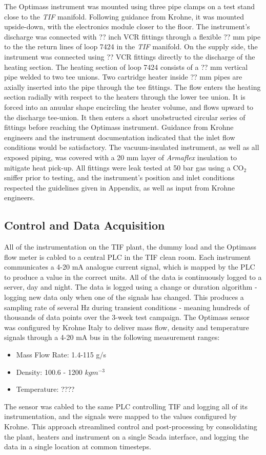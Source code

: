 \documentclass{report}
\begin{document}
The Optimass instrument was mounted using three pipe clamps on a test stand close to the \textit{TIF} manifold. Following guidance from Krohne, it was mounted upside-down, with the electronics module closer to the floor. The instrument's discharge was connected with ?? inch VCR fittings through a flexible ?? mm pipe to the the return lines of loop 7424 in the \textit{TIF} manifold. On the supply side, the instrument was connected using ?? VCR fittings directly to the discharge of the heating section. 
The heating section of loop 7424 consists of a ?? mm vertical pipe welded to two tee unions. Two cartridge heater inside ?? mm pipes are axially inserted into the pipe through the tee fittings. The flow enters the heating section radially with respect to the heaters through the lower tee union. It is forced into an anuular shape encircling the heater volume, and flows upward to the discharge tee-union. It then enters a short unobstructed circular series of fittings before reaching the Optimass instrument. Guidance from Krohne engineers and the instrument documentation indicated that the inlet flow conditions would be satisfactory.
The vacuum-insulated instrument, as well as all exposed piping, was covered with a 20 mm layer of \textit{Armaflex} insulation to mitigate heat pick-up. All fittings were leak tested at 50 bar gas using a CO$_2$ sniffer prior to testing, and the instrument's position and inlet conditions respected the guidelines given in Appendix, as well as input from Krohne engineers. 

\subsection{Control and Data Acquisition}
All of the instrumentation on the TIF plant, the dummy load and the Optimass flow meter is cabled to a central PLC in the TIF clean room. Each instrument communicates a 4-20 mA analogue current signal, which is mapped by the PLC to produce a value in the correct units. All of the data is continuously logged to a server, day and night. The data is logged using a change or duration algorithm - logging new data only when one of the signals has changed. This produces a sampling rate of several Hz during transient conditions - meaning hundreds of thousands of data points over the 3-week test campaign.
The Optimass sensor was configured by Krohne Italy to deliver mass flow, density and temperature signals through a 4-20 mA bus in the following measurement ranges:\\
\begin{itemize}
\item{Mass Flow Rate: 1.4-115 g/s} %
\item{Density: 100.6 - 1200 $kgm^{-3}$}%
\item{Temperature: ????}
\end{itemize}
The sensor was cabled to the same PLC controlling TIF and logging all of its instrumentation, and the signals were mapped to the values configured by Krohne. This approach streamlined control and post-processing by consolidating the plant, heaters and instrument on a single Scada interface, and logging the data in a single location at common timesteps. 
\end{document}
